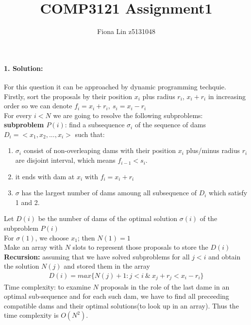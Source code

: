 \documentclass[a4paper]{scrartcl}
\title{COMP3121 Assignment1}
\author{Fiona Lin z5131048}
\begin{document}
\maketitle
\paragraph{1. Solution:}
\label{sec:Question 1}
For this question it can be approached by dynamic programming techquie.\\
Firstly, sort the proposals by their position $x_i$ plus radius $r_i$, $x_i + r_i$ in increasing order so we can denote $f_i = x_i + r_i,\ s_i = x_i - r_i$\\
For every $i < N$ we are going to resolve the following subproblems:\\
\textbf{subproblem $P(i)$}: find a subsequence $\sigma_i$ of the sequence of dams $D_i=\big<x_1, x_2,..., x_i\big>$ such that:
\begin{enumerate}[label=(\arabic*)]
  \item $\sigma_i$ consist of non-overleaping dams with their position $x_i$ plus/minus radius $r_i$ are disjoint interval, which means $f_{i-1} < s_i$.
  \item it ends with dam at $x_i$ with $f_i=x_i+r_i$
  \item $\sigma$ has the largest number of dams amoung all subsequence of $D_i$ which satisfy 1 and 2.
\end{enumerate}
Let $D(i)$ be the number of dams of the optimal solution $\sigma(i)$ of the subproblem $P(i)$\\
For $\sigma(1)$, we choose $x_1$; then $N(1)=1$\\
Make an array with $N$ slots to represent those proposals to store the $D(i)$ \\
\textbf{Recursion:} assuming that we have solved subproblems for all $j<i$ and obtain the solution $N(j)$ and stored them in the array
\begin{align*}
  D(i) =  max\{ N(j) + 1 : j < i\ \& \ x_j + r_j < x_i - r_i\}
\end{align*}
Time complexity: to examine $N$ proposals in the role of the last dame in an optimal sub-sequence and for each such dam, we have to find all preceeding compatible dams and their optimal solutions(to look up in an array). Thus the time complexity is $O(N^2)$.
\end{document}
